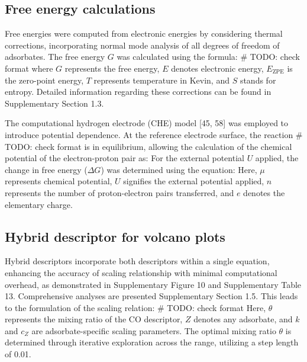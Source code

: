 \subsection{Free energy calculations}
Free energies were computed from electronic energies by considering thermal corrections, incorporating normal mode analysis of all degrees of freedom of adsorbates.
The free energy $\textit{G}$ was calculated using the formula:
# TODO: check format
where $\textit{G}$ represents the free energy, $\textit{E}$ denotes electronic energy, $\textit{E}_{\text{ZPE}}$ is the zero-point energy, $\textit{T}$ represents temperature in Kevin, and $\textit{S}$ stands for entropy.
Detailed information regarding these corrections can be found in Supplementary Section 1.3.

The computational hydrogen electrode (CHE) model [45, 58] was employed to introduce potential dependence.
At the reference electrode surface, the reaction
# TODO: check format
is in equilibrium, allowing the calculation of the chemical potential of the electron-proton pair as:
For the external potential $\textit{U}$ applied, the change in free energy ($\Delta \textit{G}$) was determined using the equation:
Here, $\mu$ represents chemical potential, $\textit{U}$ signifies the external potential applied, $\textit{n}$ represents the number of proton-electron pairs transferred, and $\textit{e}$ denotes the elementary charge.


\subsection{Hybrid descriptor for volcano plots}
Hybrid descriptors incorporate both descriptors within a single equation, enhancing the accuracy of scaling relationship with minimal computational overhead, as demonstrated in Supplementary Figure 10 and Supplementary Table 13.
Comprehensive analyses are presented Supplementary Section 1.5. This leads to the formulation of the scaling relation:
# TODO: check format
Here, $\theta$ represents the mixing ratio of the CO descriptor, $\textit{Z}$ denotes any adsorbate, and $\textit{k}$ and $\textit{c}_{Z}$ are adsorbate-specific scaling parameters.
The optimal mixing ratio $\theta$ is determined through iterative exploration across the range, utilizing a step length of 0.01.

